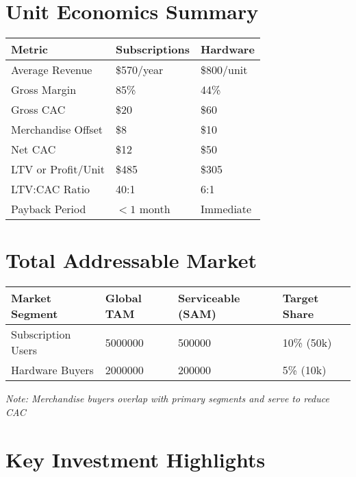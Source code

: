 \documentclass[11pt]{article}
\newcommand{\cacDigital}{20}
\newcommand{\cacEvents}{60}
\newcommand{\merchOffsetHw}{10}
\newcommand{\tamSubsGlobal}{5000000}
\newcommand{\samSubs}{500000}
\newcommand{\targetShareSubs}{10}
\newcommand{\tamHwGlobal}{2000000}
\newcommand{\samHw}{200000}
\newcommand{\targetShareHw}{5}
\begin{document}
\section{Unit Economics Summary}

\begin{table}[H]
\centering
\begin{tabularx}{\linewidth}{l Y Y}
\toprule
Metric & Subscriptions & Hardware \\\midrule
Average Revenue & \$570/year & \$800/unit \\
Gross Margin\cite{openview2023} & 85\% & 44\% \\
Gross CAC & \$\cacDigital & \$\cacEvents \\
Merchandise Offset & \$8 & \$\merchOffsetHw \\
Net CAC & \$12 & \$50 \\
LTV or Profit/Unit & \$485 & \$305 \\
LTV:CAC Ratio & 40:1 & 6:1 \\
Payback Period & $<1$ month & Immediate \\
\bottomrule
\end{tabularx}
\end{table}

\section{Total Addressable Market}

\begin{table}[H]
\centering
\begin{tabularx}{\linewidth}{l Y Y Y}
\toprule
Market Segment & Global TAM\cite{chainalysis2024,triple2023} & Serviceable (SAM) & Target Share \\\midrule
Subscription Users & \tamSubsGlobal & \samSubs & \targetShareSubs\% (50k) \\
Hardware Buyers & \tamHwGlobal & \samHw & \targetShareHw\% (10k) \\
\bottomrule
\end{tabularx}
\end{table}
\textit{Note: Merchandise buyers overlap with primary segments and serve to reduce CAC}

\section{Key Investment Highlights}
\end{document}
